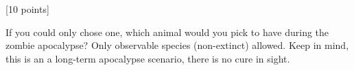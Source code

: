 \item{} [10 points]

  If you could only chose one, which animal would you pick to have during the zombie apocalypse? Only observable species (non-extinct) allowed. Keep in mind, this is an a long-term apocalypse scenario, there is no cure in sight.


